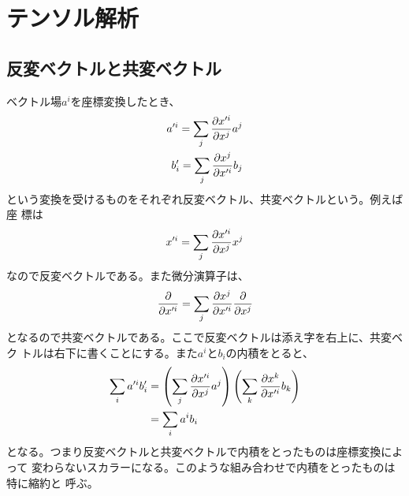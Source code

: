     \section{テンソル解析}
        \subsection{反変ベクトルと共変ベクトル}
            ベクトル場$a^i$を座標変換したとき、
            \begin{eqnarray*}
                a'^i = \sum_j \pd[x'^i]{x^j}a^j\\
                b'_i = \sum_j \pd[x^j]{x'^i}b_j
            \end{eqnarray*}
            という変換を受けるものをそれぞれ反変ベクトル、共変ベクトルという。例えば座
            標は
                \[x'^i = \sum_j \pd[x'^i]{x^j}x^j\]
            なので反変ベクトルである。また微分演算子は、
                \[\pd{x'^i} = \sum_j \pd[x^j]{x'^i}\pd{x^j}\]
            となるので共変ベクトルである。ここで反変ベクトルは添え字を右上に、共変ベク
            トルは右下に書くことにする。また$a^iとb_i$の内積をとると、
            \begin{align*}
                \sum_i a'^ib'_i &= \lr{\sum_j \pd[x'^i]{x^j}a^j}
                \lr{\sum_k \pd[x^k]{x'^i}b_k}\\
                &= \sum_i a^ib_i
            \end{align*}
            となる。つまり反変ベクトルと共変ベクトルで内積をとったものは座標変換によって
            変わらないスカラーになる。このような組み合わせで内積をとったものは特に縮約と
            呼ぶ。

